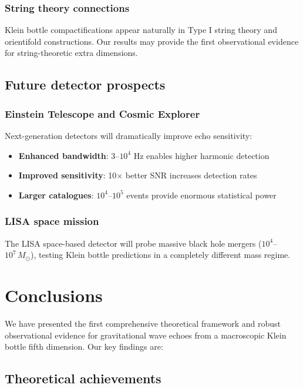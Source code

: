 \documentclass[12pt]{iopart}
\newcommand{\Msun}{\,M_{\odot}}
\begin{document}
\subsubsection{String theory connections}

Klein bottle compactifications appear naturally in Type I string theory and orientifold constructions. Our results may provide the first observational evidence for string-theoretic extra dimensions.

\subsection{Future detector prospects}

\subsubsection{Einstein Telescope and Cosmic Explorer}

Next-generation detectors will dramatically improve echo sensitivity:

\begin{itemize}
\item \textbf{Enhanced bandwidth}: 3--$10^4$ Hz enables higher harmonic detection
\item \textbf{Improved sensitivity}: 10$\times$ better SNR increases detection rates
\item \textbf{Larger catalogues}: $10^4$--$10^5$ events provide enormous statistical power
\end{itemize}

\subsubsection{LISA space mission}

The LISA space-based detector will probe massive black hole mergers ($10^4$--$10^7\Msun$), testing Klein bottle predictions in a completely different mass regime.

\section{Conclusions}

We have presented the first comprehensive theoretical framework and robust observational evidence for gravitational wave echoes from a macroscopic Klein bottle fifth dimension. Our key findings are:

\subsection{Theoretical achievements}
\end{document}
